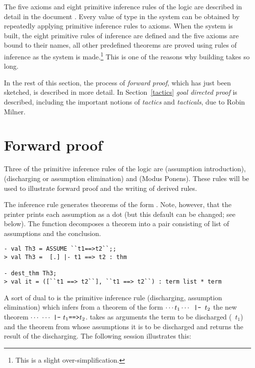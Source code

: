 The five axioms and eight primitive inference rules of the \HOL{} logic
are described in detail in the document \DESCRIPTION.  Every value of
type  in the \HOL{} system can be obtained by repeatedly
applying primitive inference rules to axioms.  When the \HOL{} system
is built, the eight primitive rules of inference are defined and the
five axioms are bound to their \ML{} names, all other predefined
theorems are proved using rules of inference as the system is
made.\footnote{This is a slight over-simplification.} This is one of
the reasons why building  takes so long.

In the rest of this section, the process of {\it forward proof\/},
which has just been sketched, is described in more detail.  In
Section~\ref{tactics} {\it goal directed proof\/} is described,
including the important notions of {\it tactics\/} and {\it
  tacticals\/}, due to Robin Milner.

\section{Forward proof}
\label{forward}

Three of the primitive inference rules of the \HOL{} logic are
 (assumption introduction),  (discharging or
assumption elimination) and  (Modus Ponens).  These rules will
be used to illustrate forward proof and the writing of derived rules.

The inference rule  generates theorems of the form . Note, however, that the \ML{} printer prints each
assumption as a dot (but this default can be changed; see below).  The
function  decomposes a theorem into a pair consisting of
list of assumptions and the conclusion.

\begin{session}
\begin{verbatim}
- val Th3 = ASSUME ``t1==>t2``;;
> val Th3 =  [.] |- t1 ==> t2 : thm

- dest_thm Th3;
> val it = ([``t1 ==> t2``], ``t1 ==> t2``) : term list * term
\end{verbatim}
\end{session}

A sort of dual to  is the primitive inference rule
 (discharging, assumption elimination) which infers from
a theorem of the form $\cdots t_1\cdots\ml{\ |-\ }t_2$ the new theorem
$\cdots\ \cdots\ \ml{|-}\ t_1\ml{==>}t_2$.  takes as arguments
the term to be discharged (\ie\ $t_1$) and the theorem from whose
assumptions it is to be discharged and returns the result of the discharging.
The following session illustrates this:

